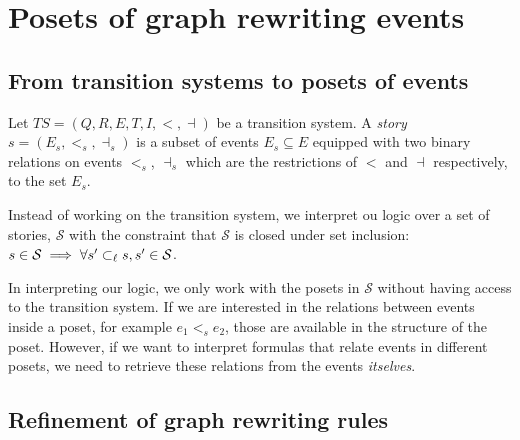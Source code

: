 \section{Posets of graph rewriting events}

\subsection{From transition systems to posets of events}

\begin{definition}[Story]
  Let $TS = (Q,R,E,T,I,<,\dashv)$ be a transition system.
  A \emph{story} $s = (E_s,<_s,\dashv_s)$ is a subset of events $E_s\subseteq E$ equipped with two binary relations on events $<_s$, $\dashv_s$ which are the restrictions of $<$ and $\dashv$ respectively, to the set $E_s$.
\end{definition}

Instead of working on the transition system, we interpret ou logic over a set of stories, $\mathcal{S}$ with the constraint that $\mathcal{S}$ is closed under set inclusion: $s\in \mathcal{S} \implies \forall s'\subset_{\ell} s, s'\in\mathcal{S}$.

\bigskip

In interpreting our logic, we only work with the posets in $\mathcal{S}$ without having access to the transition system. If we are interested in the relations between events inside a poset, for example $e_1<_s e_2$, those are available in the structure of the poset. However, if we want to interpret formulas that relate events in different posets, we need to retrieve these relations from the events \emph{itselves}.


\subsection{Refinement of graph rewriting rules}

